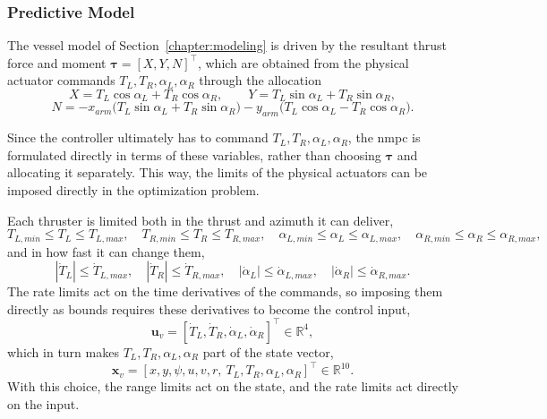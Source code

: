\subsubsection*{Predictive Model}

The vessel model of Section~\ref{chapter:modeling} is driven by the resultant thrust force and moment $\boldsymbol\tau = [X,Y,N]^\top$, which are obtained from the physical actuator commands $T_L, T_R, \alpha_L, \alpha_R$ through the allocation
\begin{equation}
    X = T_L\cos\alpha_L + T_R\cos\alpha_R, \qquad Y = T_L\sin\alpha_L + T_R\sin\alpha_R,
    \label{eq:usv_mpc_alloc_force}
\end{equation}
\begin{equation}
    N = -x_{arm}\big(T_L\sin\alpha_L+T_R\sin\alpha_R\big) - y_{arm}\big(T_L\cos\alpha_L-T_R\cos\alpha_R\big).
    \label{eq:usv_mpc_alloc_moment}
\end{equation}

Since the controller ultimately has to command $T_L, T_R, \alpha_L, \alpha_R$, the \gls{nmpc} is formulated directly in terms of these variables, rather than choosing $\boldsymbol\tau$ and allocating it separately. This way, the limits of the physical actuators can be imposed directly in the optimization problem.

Each thruster is limited both in the thrust and azimuth it can deliver,
\begin{equation}
    T_{L,min} \le T_L \le T_{L,max}, \quad T_{R,min} \le T_R \le T_{R,max}, \quad \alpha_{L,min} \le \alpha_L \le \alpha_{L,max}, \quad \alpha_{R,min} \le \alpha_R \le \alpha_{R,max},
    \label{eq:usv_mpc_state_bounds}
\end{equation}
and in how fast it can change them,
\begin{equation}
    |\dot{T}_L| \le \dot{T}_{L,max}, \quad |\dot{T}_R| \le \dot{T}_{R,max}, \quad |\dot{\alpha}_L| \le \dot{\alpha}_{L,max}, \quad |\dot{\alpha}_R| \le \dot{\alpha}_{R,max}.
    \label{eq:usv_mpc_input_bounds}
\end{equation}
The rate limits act on the time derivatives of the commands, so imposing them directly as bounds requires these derivatives to become the control input,
\begin{equation}
    \mathbf{u}_v = [\dot{T}_L, \dot{T}_R, \dot{\alpha}_L, \dot{\alpha}_R]^\top \in \mathbb{R}^4,
    \label{eq:usv_mpc_input_augmented}
\end{equation}
which in turn makes $T_L, T_R, \alpha_L, \alpha_R$ part of the state vector,
\begin{equation}
    \mathbf{x}_v = [x, y, \psi, u, v, r,\ T_L, T_R, \alpha_L, \alpha_R]^\top \in \mathbb{R}^{10}.
    \label{eq:usv_mpc_state_augmented}
\end{equation}
With this choice, the range limits act on the state, and the rate limits act directly on the input.

